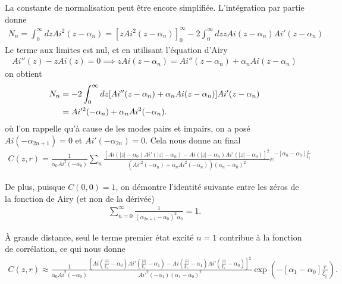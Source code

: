 La constante de normalisation peut être encore simplifiée. L'intégration par partie donne
\begin{align}
	N_n = \int_0^\infty dz Ai^2 (z -\alpha_n) = [z Ai^2 (z -\alpha_n)]_0^\infty - 2\int_0^\infty dz  z Ai(z -\alpha_n)Ai'(z -\alpha_n)
\end{align}
Le terme aux limites est nul, et en utilisant l'équation d'Airy 
\begin{align}
	Ai''(z) -zAi(z)=0 \implies z Ai(z-\alpha_n) = Ai''(z-\alpha_n) + \alpha_n Ai(z-\alpha_n)
\end{align}
on obtient
\begin{align}
	N_n &= -2\int_0^\infty dz [Ai''(z -\alpha_n)+\alpha_n Ai(z -\alpha_n)] Ai'(z -\alpha_n)  \nonumber \\
	&= Ai'^2(-\alpha_n) + \alpha_n Ai^2(-\alpha_n).
\end{align}
où l'on rappelle qu'à cause de les modes pairs et impairs, on a posé $Ai(-\alpha_{2n+1})=0$ et $Ai'(-\alpha_{2n})=0$.
Cela nous donne au final
\begin{align}
	C(z,r) = \frac{1}{\alpha_0 Ai^2(-\alpha_0)} \sum_{n} \frac{\left[ Ai(|z|-\alpha_0)Ai'(|z|-\alpha_n) -Ai(|z|-\alpha_n)Ai'(|z|-\alpha_0) \right]^2}
{(Ai'^2(-\alpha_n) + \alpha_n Ai^2(-\alpha_n))  (\alpha_n-\alpha_0)^2}e^{-[\alpha_n-\alpha_0] \frac{r}{\xi_{||}}}
\end{align}

De plus, puisque $C(0,0)=1$, on démontre l'identité suivante entre les zéros de la fonction de Airy (et non de la dérivée)
\begin{align}
\sum_{n=0}^\infty \frac{1}{(\alpha_{2n+1}-\alpha_0)^2\alpha_0} = 1.
\end{align}

À grande distance, seul le terme premier état excité $n=1$ contribue à la fonction de corrélation, ce qui nous donne
\begin{align}
C(z,r) \approx \frac{1}{\alpha_0 Ai^2(-\alpha_0)}  
        \frac{\left[Ai(\frac{|z|}{\xi_{\perp}} -\alpha_{0})Ai'( \frac{|z|}{\xi_{\perp}}-\alpha_{1})-Ai(\frac{|z|}{\xi_{\perp}} -\alpha_{1})Ai'(\frac{|z|}{\xi_{\perp}} -\alpha_{0}) \right]^2}
        { Ai'^2(-\alpha_{1}) (\alpha_1-\alpha_0)^2}\exp(-[\alpha_1-\alpha_0] \frac{r}{\xi_{||}}).
\end{align}

